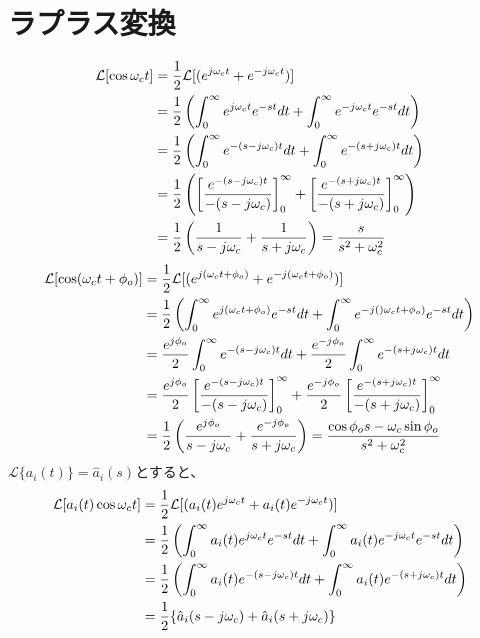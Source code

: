 \documentclass[book]{jlreq}
\begin{document}
\chapter{ラプラス変換}
%
\begin{align}
    \mathcal{L} [\cos\omega_c t]
     & = \frac{1}{2}\mathcal{L}[(e^{j\omega_c t}+e^{-j\omega_c t})]\notag                                                    \\
     & = \frac{1}{2}\left(\int_0^\infty e^{j\omega_c t} e^{-st} dt + \int_0^\infty e^{-j\omega_c t} e^{-st} dt \right)\notag \\
     & = \frac{1}{2}\left(\int_0^\infty e^{-(s-j\omega_c) t} dt + \int_0^\infty e^{-(s+j\omega_c) t} dt \right)\notag        \\
     & = \frac{1}{2}\left(\left[\frac{e^{-(s-j\omega_c) t}}{-(s-j\omega_c)}\right]_0^\infty +
    \left[\frac{e^{-(s+j\omega_c) t}}{-(s+j\omega_c)}\right]_0^\infty \right)\notag                                          \\
     & = \frac{1}{2}\left( \frac{1}{s-j\omega_c}+\frac{1}{s+j\omega_c}\right)
    = \frac{s}{s^2+\omega_c^2}
    \label{eq:lt_cos}
\end{align}
%
\begin{align}
    \mathcal{L} [\cos(\omega_c t + \phi_o)]
     & = \frac{1}{2}\mathcal{L}[(e^{j(\omega_c t+\phi_o)}+e^{-j(\omega_c t+\phi_o)})]\notag                                             \\
     & = \frac{1}{2}\left(\int_0^\infty e^{j(\omega_c t+\phi_o)} e^{-st} dt
    + \int_0^\infty e^{-j()\omega_c t+\phi_o)} e^{-st} dt \right)\notag                                                                 \\
     & = \frac{e^{j\phi_o}}{2}\int_0^\infty e^{-(s-j\omega_c) t} dt + \frac{e^{-j\phi_o}}{2}\int_0^\infty e^{-(s+j\omega_c) t} dt\notag \\
     & = \frac{e^{j\phi_o}}{2}\left[\frac{e^{-(s-j\omega_c) t}}{-(s-j\omega_c)}\right]_0^\infty
    +\frac{e^{-j\phi_o}}{2}\left[\frac{e^{-(s+j\omega_c) t}}{-(s+j\omega_c)}\right]_0^\infty\notag                                      \\
     & = \frac{1}{2}\left( \frac{e^{j\phi_o}}{s-j\omega_c}+\frac{e^{-j\phi_o}}{s+j\omega_c}\right)
    = \frac{\cos\phi_o s - \omega_c\sin\phi_o}{s^2+\omega_c^2}
    \label{eq:lt_cos_phi0}
\end{align}
%
$\mathcal{L}\{a_i(t)\} = \hat{a}_i(s)$とすると、
%
\begin{align}
    \mathcal{L} [a_i(t)\cos\omega_c t]
     & = \frac{1}{2}\mathcal{L}[(a_i(t) e^{j\omega_c t}+a_i(t) e^{-j\omega_c t})]\notag                                                    \\
     & = \frac{1}{2}\left(\int_0^\infty a_i(t) e^{j\omega_c t} e^{-st} dt + \int_0^\infty a_i(t) e^{-j\omega_c t} e^{-st} dt \right)\notag \\
     & = \frac{1}{2}\left(\int_0^\infty a_i(t) e^{-(s-j\omega_c) t} dt + \int_0^\infty a_i(t) e^{-(s+j\omega_c) t} dt \right)\notag        \\
     & = \frac{1}{2}\{\hat{a}_i(s-j\omega_c) + \hat{a}_i(s+j\omega_c)\}
    \label{eq:lt_ai_cos}
\end{align}
\end{document}
